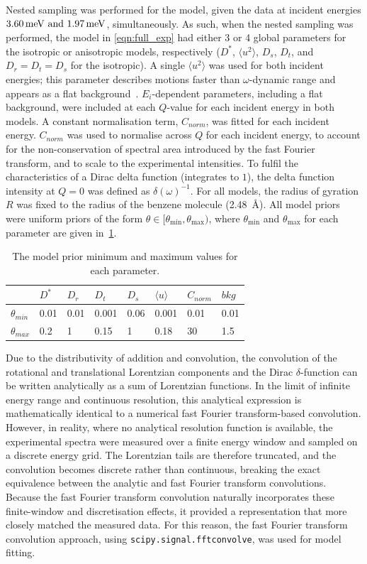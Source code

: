 \documentclass[reprint,
               superscriptaddress,
               nobibnotes,
               amsmath,
               amssymb,
               aps,
               hidelinks, 
               pre]{revtex4-2}
\begin{document}
Nested sampling was performed for the model, given the data at incident energies $\qtylist{3.60;1.97}{\milli\electronvolt}$, simultaneously. 
As such, when the nested sampling was performed, the model in \cref{eqn:full_exp} had either 3 or 4 global parameters for the isotropic or anisotropic models, respectively ($D^*$, $\langle u^2 \rangle$, $D_s$, $D_t$, and $D_r = D_t = D_s$ for the isotropic). 
A single $\langle u^2 \rangle$ was used for both incident energies; this parameter describes motions faster than $\omega$-dynamic range and appears as a flat background~\cite{Bee1988}.
$ E_i$-dependent parameters, including a flat background, were included at each $Q$-value for each incident energy in both models. 
A constant normalisation term, $C_{norm}$, was fitted for each incident energy.
$C_{norm}$ was used to normalise across $Q$ for each incident energy, to account for the non-conservation of spectral area introduced by the fast Fourier transform, and to scale to the experimental intensities.
To fulfil the characteristics of a Dirac delta function (integrates to $1$), the delta function intensity at $Q = 0$ was defined as $\delta(\omega)^{-1}$.
For all models, the radius of gyration $R$ was fixed to the radius of the benzene molecule (\qty{2.48}{\angstrom}). 
All model priors were uniform priors of the form  $\theta \in [\theta_{\min}, \theta_{\max})$, where $\theta_{\min}$ and $\theta_{\max}$ for each parameter are given in~\cref{tab:model_priors}.
%
\begin{table}[h]
\caption{The model prior minimum and maximum values for each parameter.}
\label{tab:model_priors}
\begin{tabular}{l|l|l|l|l|l|l|l}
 & $D^*$ & $D_r$ & $D_t$ & $D_s$ & $\langle u \rangle$ & $C_{norm}$ & $bkg$ \\ \hline
$\theta_{min}$ & 0.01 & 0.01 & 0.001 & 0.06 & 0.001 & 0.01 & 0.01 \\
$\theta_{max}$ & 0.2 & 1 & 0.15 & 1 & 0.18 & 30 & 1.5
\end{tabular}
\end{table}

Due to the distributivity of addition and convolution, the convolution of the rotational and translational Lorentzian components and the Dirac $\delta$-function can be written analytically as a sum of Lorentzian functions. 
In the limit of infinite energy range and continuous resolution, this analytical expression is mathematically identical to a numerical fast Fourier transform-based convolution.
However, in reality, where no analytical resolution function is available, the experimental spectra were measured over a finite energy window and sampled on a discrete energy grid. 
The Lorentzian tails are therefore truncated, and the convolution becomes discrete rather than continuous, breaking the exact equivalence between the analytic and fast Fourier transform convolutions. 
Because the fast Fourier transform convolution naturally incorporates these finite-window and discretisation effects, it provided a representation that more closely matched the measured data. 
For this reason, the fast Fourier transform convolution approach, using \texttt{scipy.signal.fftconvolve}, was used for model fitting.
\end{document}
